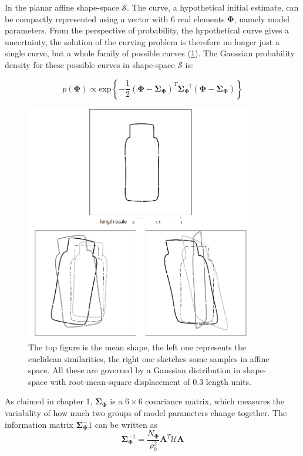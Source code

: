 In the planar affine shape-space $\mathcal{S}$. The curve, a
hypothetical initial estimate, can be compactly represented using a
vector with 6 real elements $\mathbf{\Phi}$, namely model
parameters. From the perspective of probability, the hypothetical
curve gives a uncertainty, the solution of the curving problem is
therefore no longer just a single curve, but a whole family of
possible curves (\ref{fig:prior}). The Gaussian probability density for these possible
curves in shape-space $\mathcal{S}$ is:

\begin{equation}
  \label{eq:5.1}
   p(\mathbf{\Phi}) \propto
\mathrm{exp} \left\{ -\frac{1}{2} (\mathbf{\Phi} -
  \mathbf{\Sigma}_{\mathbf{\Phi}})^T \mathbf{\Sigma}_{\mathbf{\Phi}}^{-1} (\mathbf{\Phi} -
  \mathbf{\Sigma}_{\mathbf{\Phi}}) \right\}
\end{equation}

\begin{figure}[htb]
  \centering
  \includegraphics[width=10cm]{images/prior.png}
\caption[Sampling from curve families~\cite{blake1998active}]{The top
  figure is the mean shape, the left one represents the euclidean
  similarities, the right one
  sketches some samples in affine space. All these are governed by a
  Gaussian distribution in shape-space with root-mean-square
  displacement of 0.3 length units.}
\label{fig:prior}
\end{figure}

As claimed in chapter 1, $\mathbf{\Sigma}_{\mathbf{\Phi}}$ is a $6 \times 6$ 
covariance matrix, which measures the variability of
how much two groups of model parameters change together. The
information matrix $\mathbf{\Sigma}_{\mathbf{\Phi}}^-1$ can be
written as 
\begin{equation}
  \label{eq:5.2}
  \mathbf{\Sigma}_{\mathbf{\Phi}}^{-1} = \frac{N_{\mathbf{\Phi}}}{\rho_0^2} \mathbf{A}^T\mathcal{U}\mathbf{A}
\end{equation}

